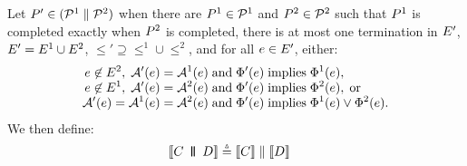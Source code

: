 \begin{definition}
  \label{def:par}
  Let $P' \in (\mathcal{P}^1 \parallel \mathcal{P}^2)$
  when there are $P^1 \in \mathcal{P}^1$ and $P^2 \in \mathcal{P}^2$
  such that
$P^1$ is completed exactly when $P^2$ is completed,
there is at most one termination in $E'$,
$E' = E^1 \cup E^2$,
${\le'}\supseteq{\le^1}\cup{\le^2}$,
and for all $e\in E'$,
either:
\begin{align*}
  e \not\in E^2,\; \mathcal{A}'(e) &= \mathcal{A}^1(e) \;\allowbreak\text{and}\allowbreak\; \Phi'(e) \; \allowbreak\text{implies}\allowbreak\; \Phi^1(e),
  \\[-1ex]
  e \not\in E^1,\; \mathcal{A}'(e) &= \mathcal{A}^2(e) \;\allowbreak\text{and}\allowbreak\; \Phi'(e) \; \allowbreak\text{implies}\allowbreak\; \Phi^2(e),\; \allowbreak\text{or}\allowbreak\;
  \\[-1ex]
  \mathcal{A}'(e) = \mathcal{A}^1(e) &= \mathcal{A}^2(e) \;\allowbreak\text{and}\allowbreak\; \Phi'(e) \; \allowbreak\text{implies}\allowbreak\; \Phi^1(e) \lor \Phi^2(e).
\end{align*}
  We then define:
\begin{align*}
  \sem[\aThrd]{\aCmd \PAR[\bThrd][\bThrd'] \bCmd} & \eqdef
  \sem[\bThrd]{\aCmd} \parallel \sem[\bThrd']{\bCmd} 
\end{align*}
\end{definition}
